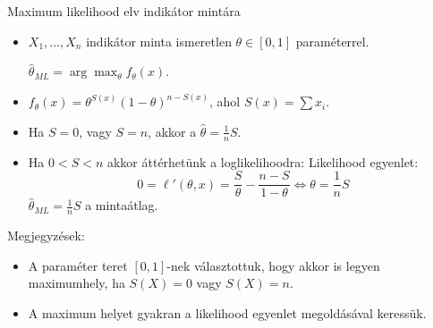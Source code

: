 \documentclass[aspectratio=169,notheorems,9pt,\option]{beamer}
\begin{document}
  \begin{frame}{Maximum likelihood elv indikátor mintára}
    \begin{itemize}
      \item $X_1,\dots,X_n$ indikátor minta ismeretlen $\theta\in[0,1]$ paraméterrel. 
      
      $\hat{\theta}_{ML}=\arg\max_\theta f_{\theta}(x)$.
      
      \item $f_\theta(x)=\theta^{S(x)}(1-\theta)^{n-S(x)}$, ahol $S(x)=\sum x_i$. 
      \item Ha $S=0$, vagy $S=n$, akkor a $\hat{\theta}=\frac1n S$.
      \item Ha $0<S<n$ akkor áttérhetünk a loglikelihoodra:
      Likelihood egyenlet:
      \begin{displaymath}
        0=\ell'(\theta,x)=\frac{S}{\theta}-\frac{n-S}{1-\theta}\iff \theta=\frac{1}n S
      \end{displaymath}
      $\hat\theta_{ML}=\frac1n S$ a mintaátlag.
    \end{itemize}
    \continue
    Megjegyzések:
    \begin{itemize}
      \item A paraméter teret $[0,1]$-nek választottuk, hogy akkor is legyen maximumhely, ha $S(X)=0$ vagy $S(X)=n$.
      \item A maximum helyet gyakran a likelihood egyenlet megoldásával keressük.
    \end{itemize}
\end{frame}
\end{document}
